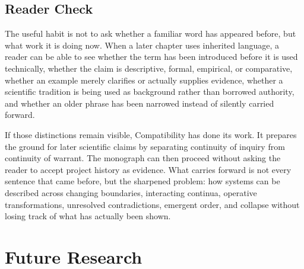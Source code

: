 \documentclass[11pt,a4paper,openany]{book}
\begin{document}
\subsection{Reader Check}
The useful habit is not to ask whether a familiar word has appeared before, but what work it is doing now. When a later chapter uses inherited language, a reader can be able to see whether the term has been introduced before it is used technically, whether the claim is descriptive, formal, empirical, or comparative, whether an example merely clarifies or actually supplies evidence, whether a scientific tradition is being used as background rather than borrowed authority, and whether an older phrase has been narrowed instead of silently carried forward. \cite{prigogine_dissipative,haken_synergetics}\par
If those distinctions remain visible, Compatibility has done its work. It prepares the ground for later scientific claims by separating continuity of inquiry from continuity of warrant. The monograph can then proceed without asking the reader to accept project history as evidence. What carries forward is not every sentence that came before, but the sharpened problem: how systems can be described across changing boundaries, interacting continua, operative transformations, unresolved contradictions, emergent order, and collapse without losing track of what has actually been shown.\par
\section{Future Research}
\end{document}
